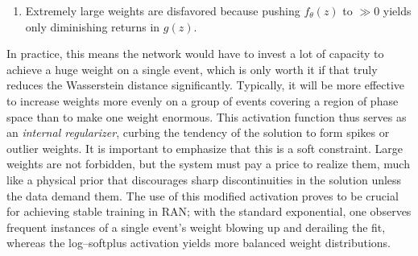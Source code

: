 {{\begin{enumerate}
                \item Extremely large weights are disfavored because pushing $f_\theta(z)$ to $\gg 0$ yields only diminishing returns in $g(z)$.
            \end{enumerate}
            In practice, this means the network would have to invest a lot of capacity to achieve a huge weight on a single event, which is only worth it if that truly reduces the Wasserstein distance significantly.
            Typically, it will be more effective to increase weights more evenly on a group of events covering a region of phase space than to make one weight enormous.
            This activation function thus serves as an \emph{internal regularizer}, curbing the tendency of the solution to form spikes or outlier weights.
            It is important to emphasize that this is a soft constraint.
            Large weights are not forbidden, but the system must pay a price to realize them, much like a physical prior that discourages sharp discontinuities in the solution unless the data demand them.
            The use of this modified activation proves to be crucial for achieving stable training in RAN; with the standard exponential, one observes frequent instances of a single event’s weight blowing up and derailing the fit, whereas the log--softplus activation yields more balanced weight distributions.
}}
